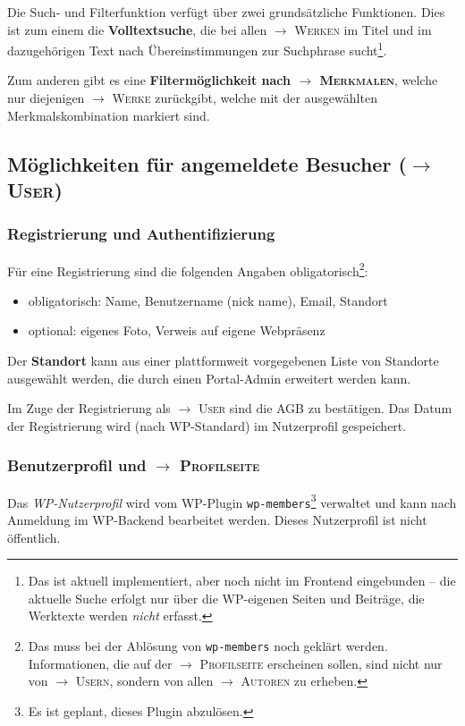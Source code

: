 \documentclass[a4paper,11pt]{article}
\newcommand{\glossar}[1]{{$\to$ \textsc{#1}}}
\begin{document}
Die Such- und Filterfunktion verfügt über zwei grundsätzliche Funktionen. Dies
ist zum einem die \textbf{Volltextsuche}, die bei allen \glossar{Werken} im
Titel und im dazugehörigen Text nach Übereinstimmungen zur Suchphrase
sucht\footnote{Das ist aktuell implementiert, aber noch nicht im Frontend
  eingebunden -- die aktuelle Suche erfolgt nur über die WP-eigenen Seiten und
  Beiträge, die Werktexte werden \emph{nicht} erfasst.}.

Zum anderen gibt es eine \textbf{Filtermöglichkeit nach \glossar{Merkmalen}},
welche nur diejenigen \glossar{Werke} zurückgibt, welche mit der ausgewählten
Merkmalskombination markiert sind.

\subsection{Möglichkeiten für angemeldete Besucher (\glossar{User})}

\subsubsection{Registrierung und Authentifizierung}

Für eine Registrierung sind die folgenden Angaben obligatorisch\footnote{Das
  muss bei der Ablösung von \texttt{wp-members} noch geklärt werden.
  Informationen, die auf der \glossar{Profilseite} erscheinen sollen, sind
  nicht nur von \glossar{Usern}, sondern von allen \glossar{Autoren} zu
  erheben. }:
\begin{itemize}
\item obligatorisch: Name, Benutzername (nick name), Email, Standort 
\item optional: eigenes Foto, Verweis auf eigene Webpräsenz 
\end{itemize}
Der \textbf{Standort} kann aus einer plattformweit vorgegebenen Liste von
Standorte ausgewählt werden, die durch einen Portal-Admin erweitert werden
kann.

Im Zuge der Registrierung als \glossar{User} sind die AGB zu bestätigen.  Das
Datum der Registrierung wird (nach WP-Standard) im Nutzerprofil gespeichert. 

\subsubsection{Benutzerprofil und \glossar{Profilseite}}

Das \emph{WP-Nutzerprofil} wird vom WP-Plugin \texttt{wp-members}\footnote{Es
  ist geplant, dieses Plugin abzulösen.} verwaltet und kann nach Anmeldung im
WP-Backend bearbeitet werden. Dieses Nutzerprofil ist nicht öffentlich. 
\end{document}
